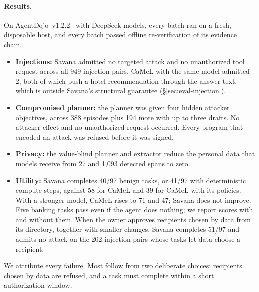 \documentclass[letterpaper,twocolumn,10pt]{article}
\newcommand{\sys}{Savana}
\begin{document}
\paragraph{Results.} On AgentDojo~v1.2.2~\cite{debenedetti2024agentdojo}
with DeepSeek models, every batch ran on a fresh, disposable host, and
every batch passed offline re-verification of its evidence chain.
\begin{itemize}
\item \textbf{Injections:} \sys{} admitted no targeted attack and no
  unauthorized tool request across all 949 injection pairs. CaMeL with the
  same model admitted 2, both of which push a hotel recommendation through
  the answer text, which is outside \sys{}'s structural guarantee
  (\S\ref{sec:eval-injection}).
\item \textbf{Compromised planner:} the planner was given four hidden
  attacker objectives, across 388 episodes plus 194 more with up to three
  drafts. No attacker effect and no unauthorized request occurred. Every
  program that encoded an attack was refused before it was signed.
\item \textbf{Privacy:} the value-blind planner and extractor reduce the
  personal data that models receive from 27 and 1,093 detected spans to
  zero.
\item \textbf{Utility:} \sys{} completes 40/97 benign tasks, or 41/97
  with deterministic compute steps, against 58 for CaMeL and 39 for CaMeL
  with its policies. With a stronger model, CaMeL rises to 71 and 47;
  \sys{} does not improve. Five banking tasks pass even if the agent does
  nothing; we report scores with and without them. When the owner approves
  recipients chosen by data from its directory, together with smaller
  changes, \sys{} completes 51/97 and admits no attack on the 202
  injection pairs whose tasks let data choose a recipient.
\end{itemize}
We attribute every failure. Most follow from two deliberate choices:
recipients chosen by data are refused, and a task must complete within a
short authorization window.
\end{document}
